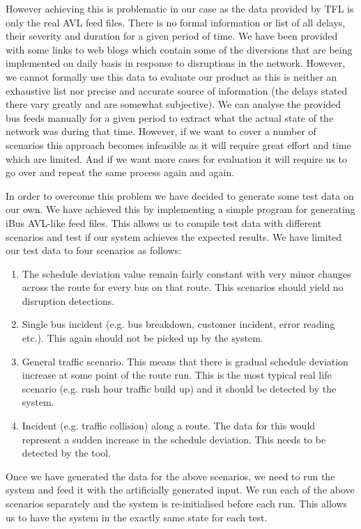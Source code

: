 However achieving this is problematic in our case as the data provided by TFL is only the real AVL feed files.
There is no formal information or list of all delays, their severity and duration for a given period of time. We have been provided with some links to web blogs which contain some of the diversions that are being implemented on daily basis in response to disruptions in the network. However, we cannot formally use this data to evaluate our product as this is neither an exhaustive list nor precise and accurate source of information (the delays stated there vary greatly and are somewhat subjective). We can analyse the provided bus feeds manually for a given period to extract what the actual state of the network was during that time. However, if we want to cover a number of scenarios this approach becomes infeasible as it will require great effort and time which are limited. And if we want more cases for evaluation it will require us to go over and repeat the same process again and again.

In order to overcome this problem we have decided to generate some test data on our own. We have achieved this by implementing a simple program for generating iBus AVL-like feed files. This allows us to compile test data with different scenarios and test if our system achieves the expected results. We have limited our test data to four scenarios as follows:
\begin{enumerate}
	\item The schedule deviation value remain fairly constant with very minor changes across the route for every bus on that route. This scenarios should yield no disruption detections.
	\item Single bus incident (e.g. bus breakdown, customer incident, error reading etc.). This again should not be picked up by the system.
	\item General traffic scenario. This means that there is gradual schedule deviation increase at some point of the route run. This is the most typical real life scenario (e.g. rush hour traffic build up) and it should be detected by the system.
	\item Incident (e.g. traffic collision) along a route. The data for this would represent a sudden increase in the schedule deviation. This needs to be detected by the tool.
\end{enumerate}

Once we have generated the data for the above scenarios, we need to run the system and feed it with the artificially generated input. We run each of the above scenarios separately and the system is re-initialised before each run. This allows us to have the system in the exactly same state for each test.

